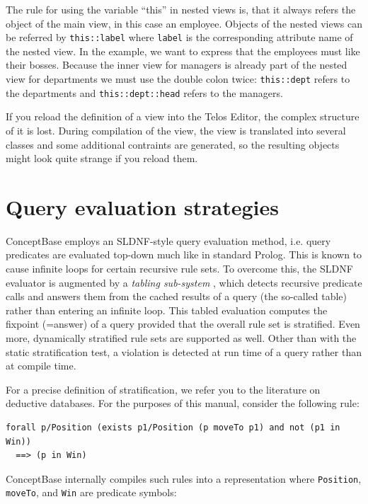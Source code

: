 The rule for using the variable ``this'' in nested views is, that
it always refers the object of the main view, in this case an employee.
Objects of the nested views can be referred by {\tt this::label}
where {\tt label} is the corresponding attribute name of the nested view.
In the example, we want to express that the employees must like
their bosses. Because the inner view for managers is already part of
the nested view for departments we must use the double colon twice:
{\tt this::dept} refers to the departments and {\tt this::dept::head}
refers to the managers.

If you reload the definition of a view into the Telos Editor,
the complex structure of it is lost. During compilation of the view,
the view is translated into several classes and some additional
contraints are generated, so the resulting objects might look quite
strange if you reload them.




\section{Query evaluation strategies} \label{sec:qev}

ConceptBase employs an SLDNF-style query evaluation method, i.e.
query predicates are evaluated top-down much like in standard Prolog.
This is known to cause infinite loops for certain recursive rule
sets. To overcome this, the SLDNF evaluator is augmented by a
{\em tabling sub-system\/} \cite{ssw94}, which detects recursive predicate calls and answers them
from the cached results of a query (the so-called table) rather than entering an infinite loop.
This tabled evaluation computes the fixpoint (=answer) of a query
provided that the overall rule set is stratified.
Even more, dynamically stratified rule sets are supported as well.
Other than with the static stratification test, a violation is
detected at run time of a query rather than at compile time.

For a precise definition of stratification, we refer you to the
literature on deductive databases. For the purposes of this manual,
consider the following rule:

{\small
\begin{verbatim}
forall p/Position (exists p1/Position (p moveTo p1) and not (p1 in Win))
  ==> (p in Win)
\end{verbatim}
}

ConceptBase internally compiles such rules into a representation where
{\tt Position}, {\tt moveTo}, and {\tt Win} are predicate symbols:

